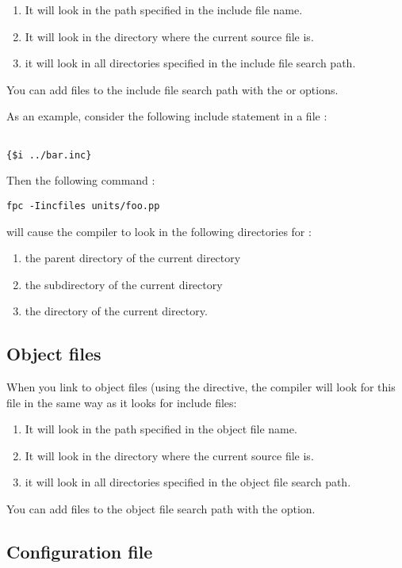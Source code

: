\begin{enumerate}
\item It will look in the path specified in the include file name.
\item It will look in the directory where the current source file is.
\item it will look in all directories specified in the include file search
path.
\end{enumerate}
You can add files to the include file search path with the  or
 options.

As an example, consider the following include statement in a file
:
\begin{verbatim}

{$i ../bar.inc}

\end{verbatim}
Then the following command :
\begin{verbatim}
fpc -Iincfiles units/foo.pp
\end{verbatim}
will cause the compiler to look in the following directories for
:
\begin{enumerate}
\item the parent directory of the current directory
\item the  subdirectory of the current directory
\item the  directory of the current directory.
\end{enumerate}

\subsection{Object files}
When you link to object files (using the  directive,
the compiler will look for this file in the same way as it looks for include
files:

\begin{enumerate}
\item It will look in the path specified in the object file name.
\item It will look in the directory where the current source file is.
\item it will look in all directories specified in the object file search path.
\end{enumerate}
You can add files to the object file search path with the  option.

\subsection{Configuration file}
\label{searchconfig}

